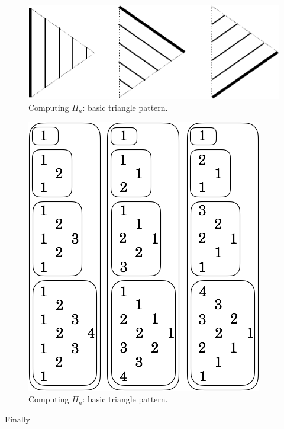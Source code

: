 \begin{figure}[h]
\begin{center}
        \includegraphics[scale=0.35]{FiguresArithmetic/appTetrahedral6}
        \caption{Computing $\Pi_n$: basic triangle pattern.}
        \label{fig:Tetrahedral6}
\end{center}
\end{figure}
\begin{figure}[h]
\begin{center}
        \includegraphics[scale=0.36]{FiguresArithmetic/appTetrahedral7}
        \caption{Computing $\Pi_n$: basic triangle pattern.}
        \label{fig:Tetrahedral7}
\end{center}
\end{figure}

Finally

